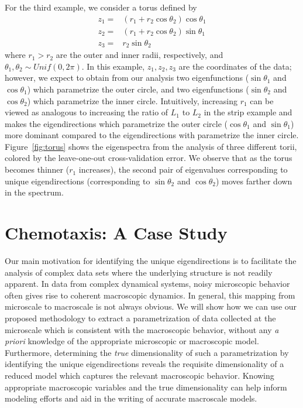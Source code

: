For the third example, we consider a torus defined by
%
\begin{equation}
\begin{aligned}
z_1 =& (r_1 + r_2 \cos \theta_2 ) \cos \theta_1 \\
z_2 =& (r_1 + r_2 \cos \theta_2 ) \sin \theta_1 \\
z_3 =& r_2 \sin \theta_2
\end{aligned}
\label{eq:torus}
\end{equation}
%
where $r_1 > r_2$ are the outer and inner radii, respectively, and $\theta_1, \theta_2 \sim Unif(0, 2 \pi)$.
%
In this example, $z_1, z_2, z_3$ are the coordinates of the data; however, we expect to obtain from our analysis two eigenfunctions ($\sin \theta_1$ and $\cos \theta_1$) which parametrize the outer circle, and two eigenfunctions ($\sin \theta_2$ and $\cos \theta_2$) which parametrize the inner circle.
%
Intuitively, increasing $r_1$ can be viewed as analogous to increasing the ratio of $L_1$ to $L_2$ in the strip example and makes the eigendirections which parametrize the outer circle ($\cos \theta_1$ and $\sin \theta_1$) more dominant compared to the eigendirections with parametrize the inner circle.
%
Figure~\ref{fig:torus} shows the eigenspectra from the analysis of three different torii, colored by the leave-one-out cross-validation error.
%
We observe that as the torus becomes thinner ($r_1$ increases), the second pair of eigenvalues corresponding to unique eigendirections (corresponding to $\sin \theta_2$ and $\cos \theta_2$) moves farther down in the spectrum.

\section{Chemotaxis: A Case Study}

Our main motivation for identifying the unique eigendirections is to facilitate the analysis of complex data sets where the underlying structure is not readily apparent.
%
In data from complex dynamical systems, noisy microscopic behavior often gives rise to coherent macroscopic dynamics.
%
In general, this mapping from microscale to macroscale is not always obvious.
%
We will show how we can use our proposed methodology to extract a parametrization of data collected at the microscale which is consistent with the macroscopic behavior, without any {\em a priori} knowledge of the appropriate microscopic or macroscopic model.
%
Furthermore, determining the {\em true} dimensionality of such a parametrization by identifying the unique eigendirections reveals the requisite dimensionality of a reduced model which captures the relevant macroscopic behavior.
%
Knowing appropriate macroscopic variables and the true dimensionality can help inform modeling efforts and aid in the writing of accurate macroscale models.

